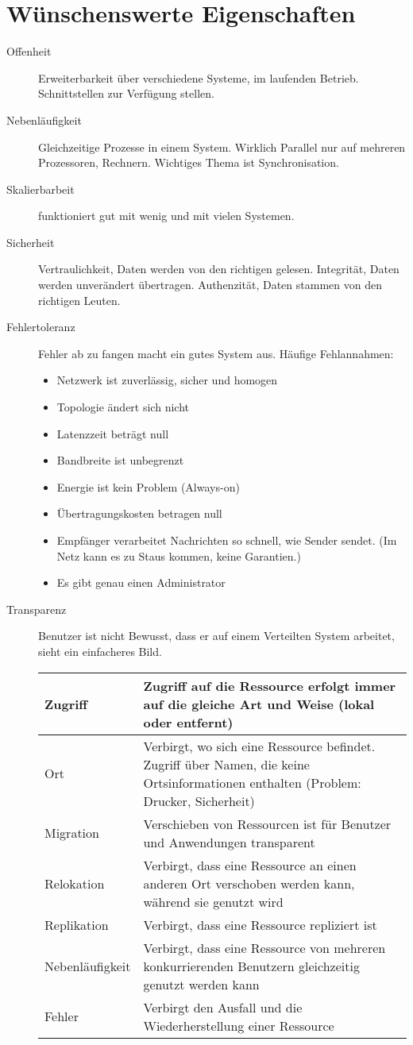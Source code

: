 \section{Wünschenswerte Eigenschaften}
\begin{description}
	\item[Offenheit] Erweiterbarkeit über verschiedene Systeme, im laufenden Betrieb. Schnittstellen zur Verfügung stellen.
	\item[Nebenläufigkeit] Gleichzeitige Prozesse in einem System. Wirklich Parallel nur auf mehreren Prozessoren, Rechnern. Wichtiges Thema ist Synchronisation.
	\item[Skalierbarbeit] funktioniert gut mit wenig und mit vielen Systemen. 
	\item[Sicherheit] Vertraulichkeit, Daten werden von den richtigen gelesen. Integrität, Daten werden unverändert übertragen. Authenzität, Daten stammen von den richtigen Leuten.
	\item[Fehlertoleranz] Fehler ab zu fangen macht ein gutes System aus. Häufige Fehlannahmen:
		\begin{itemize}
			\item Netzwerk ist zuverlässig, sicher und homogen
			\item Topologie ändert sich nicht
			\item Latenzzeit beträgt null
			\item Bandbreite ist unbegrenzt
			\item Energie ist kein Problem (Always-on)
			\item Übertragungskosten betragen null
			\item Empfänger verarbeitet Nachrichten so schnell, wie Sender sendet. (Im Netz kann es zu Staus kommen, keine Garantien.)
			\item Es gibt genau einen Administrator
		\end{itemize}
	\item[Transparenz] Benutzer ist nicht Bewusst, dass er auf einem Verteilten System arbeitet, sieht ein einfacheres Bild.
		\begin{table}[h]
			\begin{tabular}{ l |  p{11cm} }
				Zugriff & Zugriff auf die Ressource erfolgt immer auf die gleiche Art und Weise (lokal oder entfernt) \\ \hline
				Ort & Verbirgt, wo sich eine Ressource befindet. Zugriff über Namen, die keine Ortsinformationen enthalten (Problem: Drucker, Sicherheit) \\ \hline
				Migration & Verschieben von Ressourcen ist für Benutzer und Anwendungen transparent \\ \hline
				Relokation & Verbirgt, dass eine Ressource an einen anderen Ort verschoben werden kann, während sie genutzt wird \\ \hline
				Replikation &  Verbirgt, dass eine Ressource repliziert ist \\ \hline
				Nebenläufigkeit & Verbirgt, dass eine Ressource von mehreren konkurrierenden Benutzern gleichzeitig genutzt werden kann \\ \hline
				Fehler & Verbirgt den Ausfall und die Wiederherstellung einer Ressource \\
				

\end{tabular}
\end{table}
\end{description}
